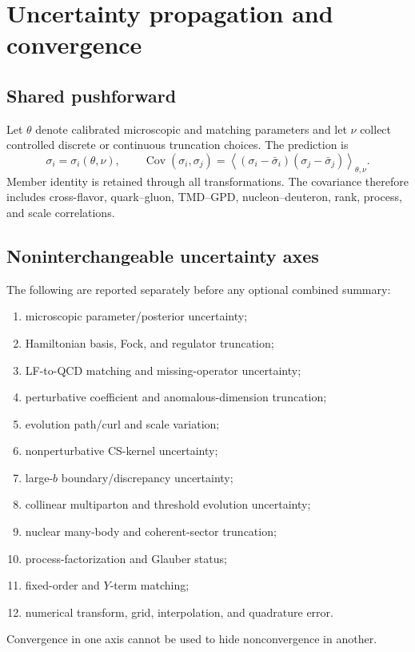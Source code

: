\documentclass[11pt]{article}
\begin{document}
\section{Uncertainty propagation and convergence}
\label{sec:uncertainty}

\subsection{Shared pushforward}

Let \(\theta\) denote calibrated microscopic and matching parameters and let
\(\nu\) collect controlled discrete or continuous truncation choices.  The
prediction is
\begin{equation}
 \sigma_i=\sigma_i(\theta,\nu),
 \qquad
 \operatorname{Cov}(\sigma_i,\sigma_j)
 =\left\langle
 (\sigma_i-\bar\sigma_i)
 (\sigma_j-\bar\sigma_j)
 \right\rangle_{\theta,\nu}.
 \label{eq:shared-covariance}
\end{equation}
Member identity is retained through all transformations.  The covariance
therefore includes cross-flavor, quark--gluon, TMD--GPD, nucleon--deuteron,
rank, process, and scale correlations.

\subsection{Noninterchangeable uncertainty axes}

The following are reported separately before any optional combined summary:
\begin{enumerate}
\item microscopic parameter/posterior uncertainty;
\item Hamiltonian basis, Fock, and regulator truncation;
\item LF-to-QCD matching and missing-operator uncertainty;
\item perturbative coefficient and anomalous-dimension truncation;
\item evolution path/curl and scale variation;
\item nonperturbative CS-kernel uncertainty;
\item large-\(b\) boundary/discrepancy uncertainty;
\item collinear multiparton and threshold evolution uncertainty;
\item nuclear many-body and coherent-sector truncation;
\item process-factorization and Glauber status;
\item fixed-order and \(Y\)-term matching;
\item numerical transform, grid, interpolation, and quadrature error.
\end{enumerate}
Convergence in one axis cannot be used to hide nonconvergence in another.
\end{document}
